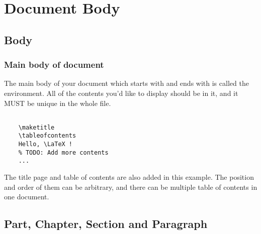 \section{Document Body}

\begin{frame}
\end{frame}

\subsection{Body}
\begin{frame}[fragile]
	\frametitle{Main body of document}
	The main body of your document which starts with \LC{} and ends with \LC{} is called the  environment. All of the contents you'd like to display should be in it, and it \alert{MUST} be \alert{unique} in the whole file.
	\begin{example}
		\begin{verbatim}

    \maketitle
    \tableofcontents
    Hello, \LaTeX !
    % TODO: Add more contents
    ...

		\end{verbatim}
	\end{example}
	The title page and table of contents are also added in this example. The position and order of them can be arbitrary, and there can be multiple table of contents in one document.
\end{frame}

\subsection{Part, Chapter, Section and Paragraph}

